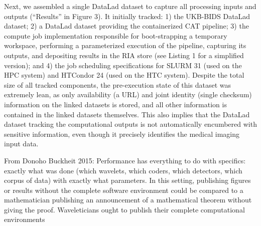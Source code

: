 Next, we assembled a single DataLad dataset to capture all processing inputs and outputs (“Results” in Figure 3). It initially tracked: 1) the UKB-BIDS DataLad dataset; 2) a DataLad dataset providing the containerized CAT pipeline; 3) the compute job implementation responsible for boot-strapping a temporary workspace, performing a parameterized execution of the pipeline, capturing its outputs, and depositing results in the RIA store (see Listing 1 for a simplified version); and 4) the job scheduling specifications for SLURM 31 (used on the HPC system) and HTCondor 24 (used on the HTC system). Despite the total size of all tracked components, the pre-execution state of this dataset was extremely lean, as only availability (a URL) and joint identity (single checksum) information on the linked datasets is stored, and all other information is contained in the linked datasets themselves. This also implies that the DataLad dataset tracking the computational outputs is not automatically encumbered with sensitive information, even though it precisely identifies the medical imaging input data.




\pagebreak


From Donoho Buckheit 2015: Performance has everything to do with specifics: exactly what was done (which wavelets,
which coders, which detectors, which corpus of data) with exactly what parameters. In
this setting, publishing figures or results without the complete software environment could
be compared to a mathematician publishing an announcement of a mathematical theorem
without giving the proof. Waveleticians ought to publish their complete computational
environments

